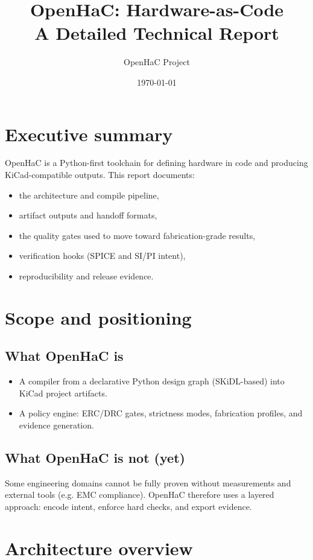 \documentclass[11pt]{report}
\title{OpenHaC: Hardware-as-Code\\A Detailed Technical Report}
\author{OpenHaC Project}
\date{\today}
\begin{document}
\maketitle
\tableofcontents

\chapter{Executive summary}

OpenHaC is a Python-first toolchain for defining hardware in code and producing KiCad-compatible outputs.
This report documents:
\begin{itemize}
  \item the architecture and compile pipeline,
  \item artifact outputs and handoff formats,
  \item the quality gates used to move toward fabrication-grade results,
  \item verification hooks (SPICE and SI/PI intent),
  \item reproducibility and release evidence.
\end{itemize}

\chapter{Scope and positioning}

\section{What OpenHaC is}
\begin{itemize}
  \item A compiler from a declarative Python design graph (SKiDL-based) into KiCad project artifacts.
  \item A policy engine: ERC/DRC gates, strictness modes, fabrication profiles, and evidence generation.
\end{itemize}

\section{What OpenHaC is not (yet)}
Some engineering domains cannot be fully proven without measurements and external tools (e.g. EMC compliance).
OpenHaC therefore uses a layered approach: encode intent, enforce hard checks, and export evidence.

\chapter{Architecture overview}
\end{document}
